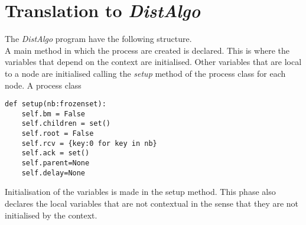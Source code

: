 \section{Translation to \textit{DistAlgo}}

The \textit{DistAlgo} program have the following structure.\\
A main method in which the process are created is declared. This is where the variables that depend on the context are initialised. Other variables that are local to a node are initialised calling the \textit{setup} method of the process class for each node.
A process class



\hfill
\begin{minipage}[c]{.45\linewidth}
\begin{verbatim}
def setup(nb:frozenset):
    self.bm = False
    self.children = set()
    self.root = False
    self.rcv = {key:0 for key in nb}
    self.ack = set()
    self.parent=None
    self.delay=None 
\end{verbatim}
\end{minipage}
\bigskip

Initialisation of the variables is made in the setup method.
This phase also declares the local variables that are not contextual in the sense that they are not initialised by the context.

